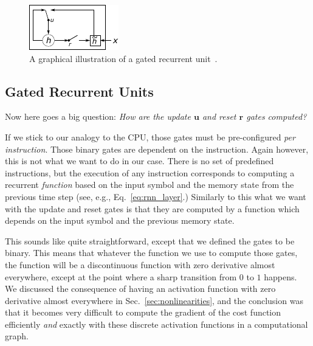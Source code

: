 \documentclass{report}
\newcommand{\vect}[1]{\mathbf{#1}}
\newcommand{\vu}[0]{\vect{u}}
\newcommand{\vr}[0]{\vect{r}}
\begin{document}
\begin{figure}[ht]
    \centering
    \begin{minipage}{0.50\textwidth}
        \centering
        \includegraphics[width=0.9\columnwidth]{figures/hidden_unit.pdf}
    \end{minipage}
    \hfill
    \begin{minipage}{0.47\textwidth}
        \caption{
            A graphical illustration of a gated recurrent
            unit~\cite{Cho-et-al-EMNLP2014}.
        }
        \label{fig:gru}
    \end{minipage}
\end{figure}

\subsection{Gated Recurrent Units}
\label{sec:gru}

Now here goes a big question: {\em How are the update $\vu$ and reset $\vr$
gates computed?}

If we stick to our analogy to the CPU, those gates must be pre-configured {\em
per instruction}. Those binary gates are dependent on the instruction. Again
however, this is not what we want to do in our case. There is no set of
predefined instructions, but the execution of any instruction corresponds to
computing a recurrent {\em function} based on the input symbol and the memory
state from the previous time step (see, e.g., Eq.~\eqref{eq:rnn_layer}.)
Similarly to this what we want with the update and reset gates is that they are
computed by a function which depends on the input symbol and the previous memory
state.

This sounds like quite straightforward, except that we defined the gates to be
binary. This means that whatever the function we use to compute those gates, the
function will be a discontinuous function with zero derivative almost
everywhere, except at the point where a sharp transition from $0$ to $1$
happens. We discussed the consequence of having an activation function with zero
derivative almost everywhere in Sec.~\ref{sec:nonlinearities}, and the
conclusion was that it becomes very difficult to compute the gradient of the
cost function efficiently {\em and} exactly with these discrete activation
functions in a computational graph.
\end{document}

